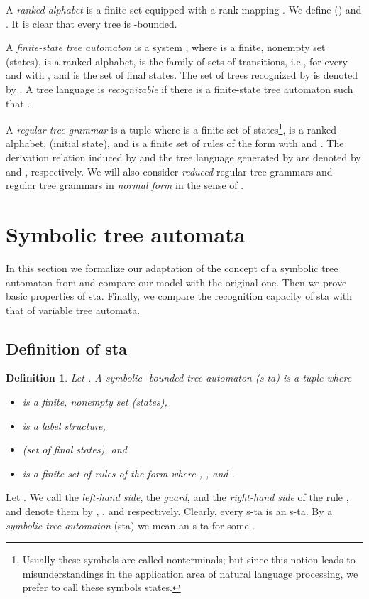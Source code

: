 \documentclass[10pt]{scrartcl}
\newtheorem{df}{Definition}[section]
\begin{document}
A {\em ranked alphabet} is a finite set  equipped with a rank mapping . We define  () and . 
It is clear that every tree  is -bounded.

A \emph{finite-state tree automaton} is a system , where  is a finite, nonempty  set (states),   is a ranked alphabet,   is the family of sets of transitions, i.e.,  for every  and  with , and  is the set of final states. The set of trees recognized by  is denoted by .
A tree language  is {\em recognizable} if there is a finite-state tree automaton  such that .


A \emph{regular tree grammar} is a tuple  where  is a finite set of states\footnote{Usually these symbols are called nonterminals; but since this notion leads to misunderstandings in the application area of natural language processing, we prefer to call these symbols states.},  is a ranked alphabet,  (initial state), and   is a finite set of rules of the form  with  and . The derivation relation induced by  and the tree language generated by  are denoted by  and , respectively.
We will also consider {\em reduced} regular tree grammars and regular tree grammars in {\em normal form} in the sense of \cite{comdaugiljaclugtistom97}.




\section{Symbolic tree automata}

In this section we formalize our adaptation of the concept of a symbolic tree automaton from \cite{veabjo11a} and compare our model with the original one. Then we prove basic properties of sta. Finally, we compare the recognition capacity of sta with that of variable tree automata.


\subsection{Definition of sta}\label{sect:sta-def}

\begin{df} \rm Let . A \emph{symbolic -bounded  tree automaton} (s-ta) is a tuple  where 
\begin{itemize}
\item  is a finite, nonempty set (states),
\item  is a label structure,
\item  (set of final states), and 
\item  is a finite set of rules of the form 
where , , and . 
\end{itemize} 
\end{df}
Let . We call  the {\em left-hand side},  the \emph{guard}, and   the {\em right-hand side} of the rule , and denote them by , , and  respectively. 
Clearly, every s-ta is an s-ta.  By a {\em symbolic tree automaton} (sta) we mean an s-ta for some .
\end{document}
